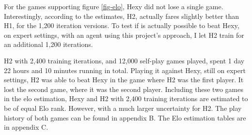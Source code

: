 For the games supporting figure \ref{fig-elo}, Hexy did not lose a single game. Interestingly, according to the estimates, H2, actually fares slightly better than H1, for the 1,200 iteration versions. To test if is actually possible to beat Hexy, on expert settings, with an agent using this project's approach, I let H2 train for an additional 1,200 iterations.

H2 with 2,400 training iterations, and 12,000 self-play games played, spent 1 day 22 hours and 10 minutes running in total. Playing it against Hexy, still on expert settings, H2 was able to beat Hexy in the game where H2 was the first player. It lost the second game, where it was the second player. Including these two games in the elo estimation, Hexy and H2 with 2,400 training iterations are estimated to be of equal Elo rank. However, with a much larger uncertainty for H2. The play history of both games can be found in appendix B. The Elo estimation tables are in appendix C.
